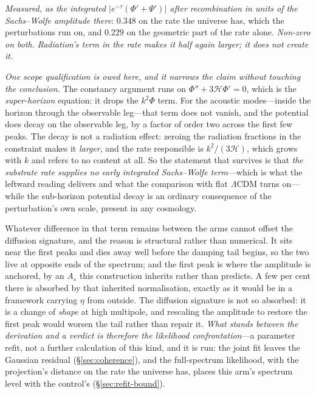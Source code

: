 \documentclass[11pt,a4paper]{article}
\theoremstyle{plain}
\theoremstyle{definition}
\theoremstyle{remark}
\begin{document}
\emph{Measured, as the integrated $|e^{-\tau}(\Phi'+\Psi')|$ after recombination in units of the
Sachs--Wolfe amplitude there}: $0.348$ on the rate the universe has, which the perturbations run on, and
$0.229$ on the geometric part of the rate alone. \emph{Non-zero on both.} \emph{Radiation's term in the rate
makes it half again larger; it does not create it.}

\emph{One scope qualification is owed here, and it narrows the claim without touching the conclusion.} The
constancy argument runs on $\Phi''+3\mathcal{H}\Phi'=0$, which is the \emph{super-horizon} equation: it drops
the $k^{2}\Phi$ term. For the acoustic modes---inside the horizon through the observable leg---that term does not vanish, and the potential does decay on the observable leg, by a factor of order two across the first few
peaks. The decay is not a radiation effect: zeroing the radiation fractions in
the constraint makes it \emph{larger}, and the rate responsible is $k^{2}/(3\mathcal{H})$, which grows with $k$
and refers to no content at all. So the statement that survives is that \emph{the substrate rate supplies no
early integrated Sachs--Wolfe term}---which is what the leftward reading delivers and what the comparison with
flat $\Lambda$CDM turns on---while the sub-horizon potential decay is an ordinary consequence of the
perturbation's own scale, present in any cosmology.

Whatever difference in that term remains between the arms cannot offset the diffusion signature, and the reason is structural rather than
numerical. It sits near the first peaks and dies away well before the damping tail begins, so the two live at
opposite ends of the spectrum; and the first peak is where the amplitude is anchored, by an $A_s$ this
construction inherits rather than predicts. A few per cent there is absorbed by that inherited normalisation,
exactly as it would be in a framework carrying $\eta$ from outside. The diffusion signature is not so absorbed:
it is a change of \emph{shape} at high multipole, and rescaling the amplitude to restore the first peak would
worsen the tail rather than repair it. \emph{What stands between the derivation and a verdict is therefore the
likelihood confrontation}---a parameter refit, not a further calculation of this kind, and it is run: the
joint fit leaves the Gaussian residual (\S\ref{sec:coherence}), and the full-spectrum likelihood, with the
projection's distance on the rate the universe has, places this arm's spectrum level with the control's
(\S\ref{sec:refit-bound}).
\end{document}
